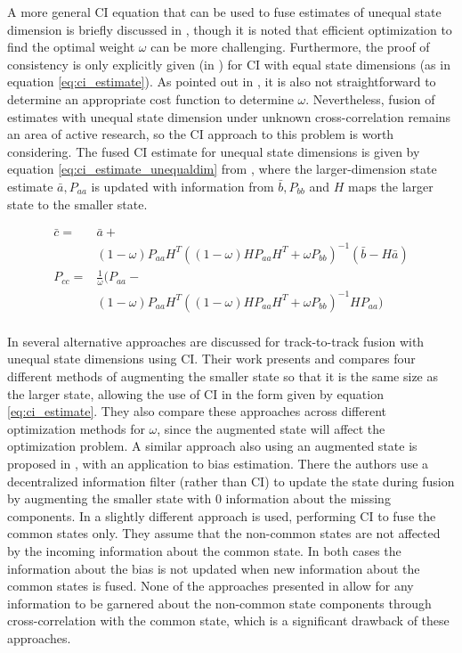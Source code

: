 \documentclass[journal]{IEEEtran}
\begin{document}
A more general CI equation that can be used to fuse estimates of unequal state dimension is briefly discussed in \cite{uhlmann1995dynamic}, though it is noted that efficient optimization to find the optimal weight $\omega$ can be more challenging. Furthermore, the proof of consistency is only explicitly given (in \cite{julier1997non, uhlmann1995dynamic}) for CI with equal state dimensions (as in equation \ref{eq:ci_estimate}). As pointed out in \cite{klemets2018hierarchical}, it is also not straightforward to determine an appropriate cost function to determine $\omega$. Nevertheless, fusion of estimates with unequal state dimension under unknown cross-correlation remains an area of active research, so the CI approach to this problem is worth considering. The fused CI estimate for unequal state dimensions is given by equation \ref{eq:ci_estimate_unequaldim} from \cite{uhlmann1995dynamic}, where the larger-dimension state estimate $\bar{a}, P_{aa}$ is updated with information from $\bar{b}, P_{bb}$ and $H$ maps the larger state to the smaller state.

\begin{equation}
\begin{aligned}
    \bar{c} = {}& \bar{a} + \\
    \ {}& (1-\omega) P_{aa} H^T ((1-\omega) H P_{aa} H^T + \omega P_{bb})^{-1}(\bar{b} - H \bar{a}) \\
    P_{cc} = {}& \frac{1}{\omega} (P_{aa} - \\
    \ {}& (1-\omega) P_{aa} H^T ((1-\omega) H P_{aa} H^T + \omega P_{bb})^{-1} H P_{aa} )\\
\end{aligned} \label{eq:ci_estimate_unequaldim}
\end{equation}

In \cite{allig2020unequal} several alternative approaches are discussed for track-to-track fusion with unequal state dimensions using CI. Their work presents and compares four different methods of augmenting the smaller state so that it is the same size as the larger state, allowing the use of CI in the form given by equation \ref{eq:ci_estimate}. They also compare these approaches across different optimization methods for $\omega$, since the augmented state will affect the optimization problem. A similar approach also using an augmented state is proposed in \cite{saini2018decentralized}, with an application to bias estimation. There the authors use a decentralized information filter (rather than CI) to update the state during fusion by augmenting the smaller state with 0 information about the missing components. In \cite{saini2019decentralized} a slightly different approach is used, performing CI to fuse the common states only. They assume that the non-common states are not affected by the incoming information about the common state. In both cases the information about the bias is not updated when new information about the common states is fused. None of the approaches presented in \cite{allig2020unequal, saini2019decentralized, saini2018decentralized} allow for any information to be garnered about the non-common state components through cross-correlation with the common state, which is a significant drawback of these approaches.
\end{document}
